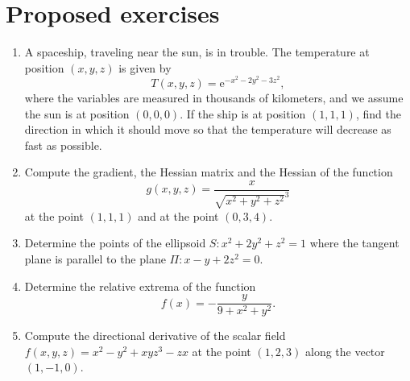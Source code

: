 \section{Proposed exercises}
\begin{enumerate}[leftmargin=*]
\item A spaceship, traveling near the sun, is in trouble.
      The temperature at position $(x,y,z)$ is given by
      \[T(x,y,z)=\mbox{e}^{-x^2-2y^2-3z^2},\]
      where the variables are measured
      in thousands of kilometers, and we assume the sun is at position $(0,0,0)$.
      If the ship is at position $(1,1,1)$, find the direction in which it should move so that the temperature will decrease as fast as possible.

\item Compute the gradient, the Hessian matrix and the Hessian of the function
      \[
      g(x,y,z) = \frac{x}{\sqrt{x^2+y^2+z^2}^3}
      \]
      at the point $(1,1,1)$ and at the point $(0,3,4)$.

\item Determine the points of the ellipsoid $S: x^2+2y^2+z^2=1$ where the tangent plane is parallel to the plane $\Pi:
      x-y+2z^2=0$.

\item Determine the relative extrema of the function
      \[
      f(x)=-\frac{y}{9+x^2+y^2}.
      \]

\item Compute the directional derivative of the scalar field $f(x,y,z)=x^2-y^2+xyz^3-zx$ at the point $(1,2,3)$ along the vector $(1,-1,0)$.
\end{enumerate}
